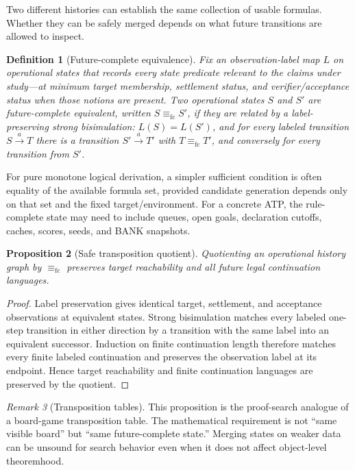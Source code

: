 \documentclass[11pt]{article}
\newtheorem{definition}{Definition}[section]
\newtheorem{proposition}[definition]{Proposition}
\theoremstyle{remark}
\newtheorem{remark}[definition]{Remark}
\begin{document}
Two different histories can establish the same collection of usable formulas. Whether they can be safely merged depends on what future transitions are allowed to inspect.

\begin{definition}[Future-complete equivalence]
Fix an observation-label map $L$ on operational states that records every state predicate relevant to the claims under study---at minimum target membership, settlement status, and verifier/acceptance status when those notions are present. Two operational states $S$ and $S'$ are future-complete equivalent, written $S\equiv_{\mathrm{fc}}S'$, if they are related by a label-preserving strong bisimulation: $L(S)=L(S')$, and for every labeled transition $S\xrightarrow{a}T$ there is a transition $S'\xrightarrow{a}T'$ with $T\equiv_{\mathrm{fc}}T'$, and conversely for every transition from $S'$.
\end{definition}

For pure monotone logical derivation, a simpler sufficient condition is often equality of the available formula set, provided candidate generation depends only on that set and the fixed target/environment. For a concrete ATP, the rule-complete state may need to include queues, open goals, declaration cutoffs, caches, scores, seeds, and BANK snapshots.

\begin{proposition}[Safe transposition quotient]
Quotienting an operational history graph by $\equiv_{\mathrm{fc}}$ preserves target reachability and all future legal continuation languages.
\end{proposition}

\begin{proof}
Label preservation gives identical target, settlement, and acceptance observations at equivalent states. Strong bisimulation matches every labeled one-step transition in either direction by a transition with the same label into an equivalent successor. Induction on finite continuation length therefore matches every finite labeled continuation and preserves the observation label at its endpoint. Hence target reachability and finite continuation languages are preserved by the quotient.
\end{proof}

\begin{remark}[Transposition tables]
This proposition is the proof-search analogue of a board-game transposition table. The mathematical requirement is not ``same visible board'' but ``same future-complete state.'' Merging states on weaker data can be unsound for search behavior even when it does not affect object-level theoremhood.
\end{remark}
\end{document}
